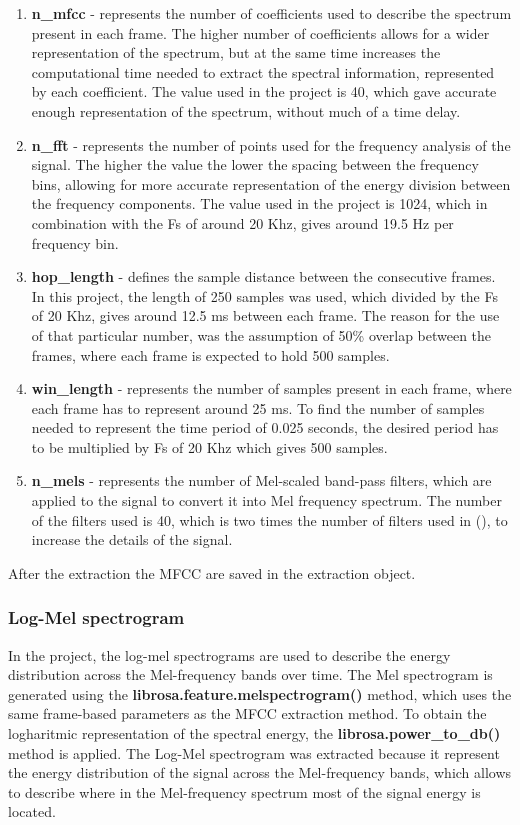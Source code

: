     \begin{enumerate}
        \item \textbf{n\_mfcc} - represents the number of coefficients used to describe the spectrum present in each frame. The higher number of coefficients allows for a wider representation of the spectrum, but at the same time increases the computational time needed to extract the spectral information, represented by each coefficient. The value used in the project is 40, which gave accurate enough representation of the spectrum, without much of a time delay.\\
    \item \textbf{n\_fft} - represents the number of points used for the frequency analysis of the signal. The higher the value the lower the spacing between the frequency bins, allowing for more accurate representation of the energy division between the frequency components. The value used in the project is 1024, which in combination with the Fs of around 20 Khz, gives around 19.5 Hz per frequency bin.\\
    \item \textbf{hop\_length} - defines the sample distance between the consecutive frames. In this project, the length of 250 samples was used, which divided by the Fs of 20 Khz, gives around 12.5 ms between each frame. The reason for the use of that particular number, was the assumption of 50\% overlap between the frames, where each frame is expected to hold 500 samples.\\
    \item \textbf{win\_length} - represents the number of samples present in each frame, where each frame has to represent around 25 ms. To find the number of samples needed to represent the time period of 0.025 seconds, the desired period has to be multiplied by Fs of 20 Khz which gives 500 samples.
    \item  \textbf{n\_mels} - represents the number of Mel-scaled band-pass filters, which are applied to the signal to convert it into Mel frequency spectrum. The number of the filters used is 40, which is two times the number of filters used in (\cite{singh2014mfcc}), to increase the details of the signal. 
    \end{enumerate}

    After the extraction the MFCC are saved in the extraction object. 
    
    \subsubsection{Log-Mel spectrogram}
    In the project, the log-mel spectrograms are used to describe the energy distribution across the Mel-frequency bands over time. 
    The Mel spectrogram is generated using the \textbf{librosa.feature.melspectrogram()} method, which uses the same frame-based parameters as the MFCC extraction method. To obtain the  logharitmic representation of the spectral energy, the \textbf{librosa.power\_to\_db()} method is applied. The Log-Mel spectrogram was extracted because it represent the energy distribution of the signal across the Mel-frequency bands, which allows to describe where in the Mel-frequency spectrum most of the signal energy is located.
    
